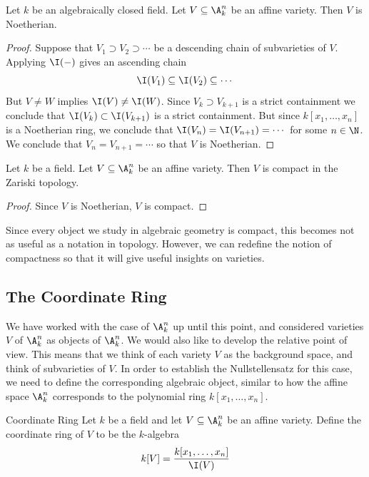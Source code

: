 \documentclass[a4paper]{article}
\begin{document}
\begin{prp}{}{} Let $k$ be an algebraically closed field. Let $V\subseteq\A_k^n$ be an affine variety. Then $V$ is Noetherian. 
\begin{proof}
Suppose that $V_1\supset V_2\supset\cdots$ be a descending chain of subvarieties of $V$. Applying $\I(-)$ gives an ascending chain $$\I(V_1)\subseteq\I(V_2)\subseteq\cdots$$ But $V\neq W$ implies $\I(V)\neq\I(W)$. Since $V_k\supset V_{k+1}$ is a strict containment we conclude that $\I(V_k)\subset\I(V_{k+1})$ is a strict containment. But since $k[x_1,\dots,x_n]$ is a Noetherian ring, we conclude that $\I(V_n)=\I(V_{n+1})=\cdots$ for some $n\in\N$. We conclude that $V_n=V_{n+1}=\cdots$ so that $V$ is Noetherian. 
\end{proof}
\end{prp}

\begin{crl}{}{} Let $k$ be a field. Let $V\subseteq\A_k^n$ be an affine variety. Then $V$ is compact in the Zariski topology. 
\begin{proof}
Since $V$ is Noetherian, $V$ is compact. 
\end{proof}
\end{crl}

Since every object we study in algebraic geometry is compact, this becomes not as useful as a notation in topology. However, we can redefine the notion of compactness so that it will give useful insights on varieties. 

\subsection{The Coordinate Ring}
We have worked with the case of $\A_k^n$ up until this point, and considered varieties $V$ of $\A_k^n$  as objects of $\A_k^n$. We would also like to develop the relative point of view. This means that we think of each variety $V$ as the background space, and think of subvarieties of $V$. In order to establish the Nullstellensatz for this case, we need to define the corresponding algebraic object, similar to how the affine space $\A_k^n$ corresponds to the polynomial ring $k[x_1,\dots,x_n]$. 

\begin{defn}{Coordinate Ring}{} Let $k$ be a field and let $V\subseteq\A_k^n$ be an affine variety. Define the coordinate ring of $V$ to be the $k$-algebra $$k[V]=\frac{k[x_1,\dots,x_n]}{\I(V)}$$
\end{defn}
\end{document}

